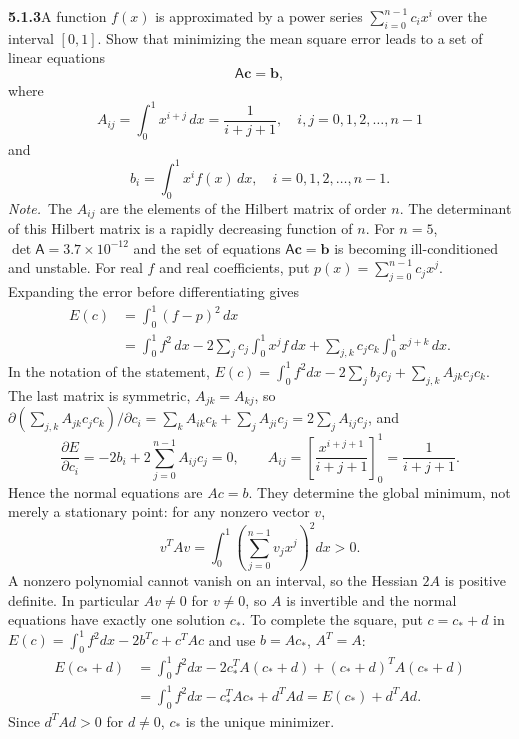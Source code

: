 \par\bigskip
\noindent\textbf{5.1.3}\quad A  function $f(x)$ is approximated by a power
series $\sum_{i=0}^{n-1}c_{i}x^{i}$ over the interval $[0,1]$. Show that
minimizing the mean square error leads to a set of linear equations
\[
\mathsf{A}\mathbf{c}=\mathbf{b},
\]
where
\[
A_{ij}=\int_{0}^{1}x^{i+j}\,dx=\frac{1}{i+j+1},\quad i,j=0,1,2,\ldots,n-1
\]
and
\[
b_{i}=\int_{0}^{1}x^{i}f(x)\,dx,\quad i=0,1,2,\ldots,n-1.
\]
\emph{Note.}~The $A_{ij}$ are the elements of the Hilbert matrix of order $n$.
The determinant of this Hilbert matrix is a rapidly decreasing function of
$n$. For $n=5$, $\det\mathsf{A}=3.7\times10^{-12}$ and the set of equations
$\mathsf{A}\mathbf{c}=\mathbf{b}$ is becoming ill-conditioned and unstable.
\solution
{}
For real $f$ and real coefficients, put $p(x)=\sum_{j=0}^{n-1}c_jx^j$.
Expanding the error before differentiating gives
\begin{align*}
E(c)&=\int_0^1(f-p)^2\,dx\\
&=\int_0^1 f^2\,dx
 -2\sum_jc_j\int_0^1x^jf\,dx
 +\sum_{j,k}c_jc_k\int_0^1x^{j+k}\,dx.
\end{align*}
In the notation of the statement,
$E(c)=\int_0^1f^2dx-2\sum_jb_jc_j+\sum_{j,k}A_{jk}c_jc_k$. The last matrix
is symmetric, $A_{jk}=A_{kj}$, so
$\partial(\sum_{j,k}A_{jk}c_jc_k)/\partial c_i
=\sum_kA_{ik}c_k+\sum_jA_{ji}c_j=2\sum_jA_{ij}c_j$, and
\[
\frac{\partial E}{\partial c_i}
=-2b_i+2\sum_{j=0}^{n-1}A_{ij}c_j=0,
\qquad
A_{ij}=\left[\frac{x^{i+j+1}}{i+j+1}\right]_0^1
=\frac1{i+j+1}.
\]
Hence the normal equations are $\boxed{Ac=b}$. They determine the global
minimum, not merely a stationary point: for any nonzero vector $v$,
\[
v^TAv=\int_0^1\left(\sum_{j=0}^{n-1}v_jx^j\right)^2dx>0.
\]
A nonzero polynomial cannot vanish on an interval, so the Hessian $2A$ is
positive definite. In particular $Av\ne0$ for $v\ne0$, so $A$ is invertible
and the normal equations have exactly one solution $c_*$. To complete the
square, put $c=c_*+d$ in $E(c)=\int_0^1f^2dx-2b^Tc+c^TAc$ and use
$b=Ac_*$, $A^T=A$:
\begin{align*}
E(c_*+d)&=\int_0^1f^2dx-2c_*^TA(c_*+d)+(c_*+d)^TA(c_*+d)\\
&=\int_0^1f^2dx-c_*^TAc_*+d^TAd=E(c_*)+d^TAd.
\end{align*}
Since $d^TAd>0$ for $d\ne0$, $c_*$ is the unique minimizer.

